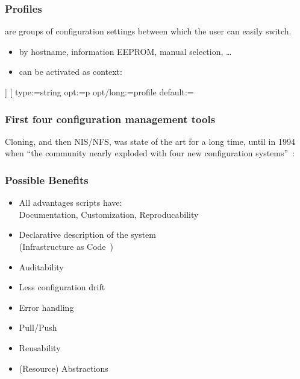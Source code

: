 \begin{frame}[fragile]
	\frametitle{Profiles}

	 are groups of configuration settings between which the user can easily switch.

	\begin{itemize}
	\item by hostname, information EEPROM, manual selection, \dots
	\item can be activated as context:
	\end{itemize}

	\begin{code}[morekeywords={long},gobble=4]]
	[%
	  type:=string
	  opt:=p
	  opt/long:=profile
	  default:=
	\end{code}
\end{frame}


\begin{frame}
	\frametitle{First four configuration management tools}
	Cloning, and then NIS/NFS, was state of the art for a long time, until in 1994 when \enquote{the community nearly exploded with four new configuration systems}~\cite{evard1997analysis}:

\end{frame}

\begin{frame}
	\frametitle{Possible Benefits}

	\begin{itemize}[<+-| alert@+>]
	\item All advantages scripts have: \\
		Documentation, Customization, Reproducability
	\item Declarative description of the system \\
		(Infrastructure as Code~\cite{waldemar2013testing})
	\item Auditability
	\item Less configuration drift
	\item Error handling
	\item Pull/Push
	\item Reusability
	\item (Resource) Abstractions
	\end{itemize}
\end{frame}


